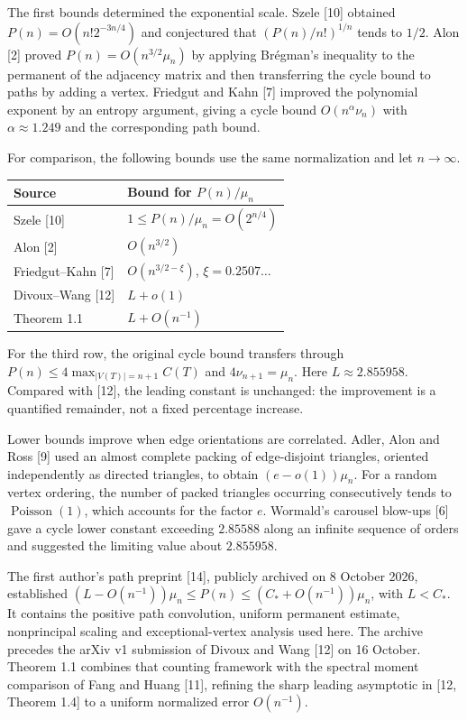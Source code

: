 \documentclass[11pt,a4paper]{article}
\begin{document}
The first bounds determined the exponential scale. Szele {[}10{]} obtained \(P(n)=O(n!2^{-3n/4})\) and conjectured that \((P(n)/n!)^{1/n}\) tends to \(1/2\). Alon {[}2{]} proved \(P(n)=O(n^{3/2}\mu_n)\) by applying Brégman's inequality to the permanent of the adjacency matrix and then transferring the cycle bound to paths by adding a vertex. Friedgut and Kahn {[}7{]} improved the polynomial exponent by an entropy argument, giving a cycle bound \(O(n^\alpha\nu_n)\) with \(\alpha\approx1.249\) and the corresponding path bound.


For comparison, the following bounds use the same normalization and let \(n\to\infty\).

\begin{longtable}[]{@{}ll@{}}
\toprule\noalign{}
Source & Bound for \(P(n)/\mu_n\) \\
\midrule\noalign{}
\endhead
\bottomrule\noalign{}
\endlastfoot
Szele {[}10{]} & \(1\le P(n)/\mu_n=O(2^{n/4})\) \\
Alon {[}2{]} & \(O(n^{3/2})\) \\
Friedgut--Kahn {[}7{]} & \(O(n^{3/2-\xi})\), \(\xi=0.2507\ldots\) \\
Divoux--Wang {[}12{]} & \(L+o(1)\) \\
Theorem 1.1 & \(L+O(n^{-1})\) \\
\end{longtable}

For the third row, the original cycle bound transfers through \(P(n)\le4\max_{|V(T)|=n+1}C(T)\) and \(4\nu_{n+1}=\mu_n\). Here \(L\approx2.855958\). Compared with {[}12{]}, the leading constant is unchanged: the improvement is a quantified remainder, not a fixed percentage increase.

Lower bounds improve when edge orientations are correlated. Adler, Alon and Ross {[}9{]} used an almost complete packing of edge-disjoint triangles, oriented independently as directed triangles, to obtain \((e-o(1))\mu_n\). For a random vertex ordering, the number of packed triangles occurring consecutively tends to \(\operatorname{Poisson}(1)\), which accounts for the factor \(e\). Wormald's carousel blow-ups {[}6{]} gave a cycle lower constant exceeding \(2.85588\) along an infinite sequence of orders and suggested the limiting value about \(2.855958\).

The first author's path preprint {[}14{]}, publicly archived on 8 October 2026, established \((L-O(n^{-1}))\mu_n\le P(n)\le(C_*+O(n^{-1}))\mu_n\), with \(L<C_*\). It contains the positive path convolution, uniform permanent estimate, nonprincipal scaling and exceptional-vertex analysis used here. The archive precedes the arXiv v1 submission of Divoux and Wang {[}12{]} on 16 October. Theorem 1.1 combines that counting framework with the spectral moment comparison of Fang and Huang {[}11{]}, refining the sharp leading asymptotic in {[}12, Theorem 1.4{]} to a uniform normalized error \(O(n^{-1})\).
\end{document}
